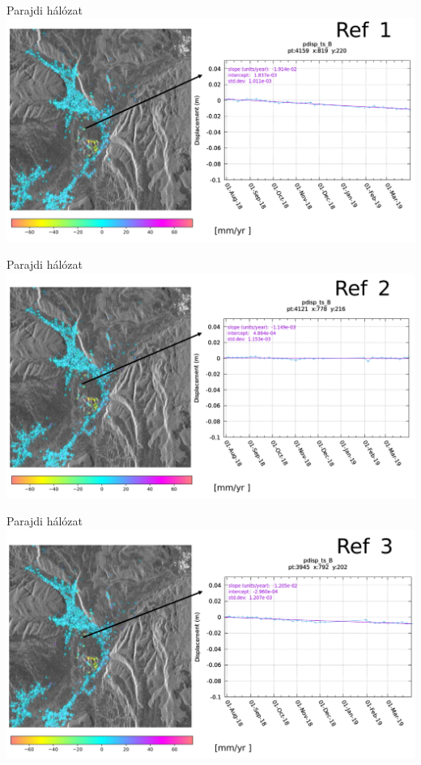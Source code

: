 \documentclass{beamer}
\begin{document}
\begin{frame}{Parajdi hálózat}
\includegraphics[width=\textwidth]{parajd_ts2.png}
\end{frame}

\begin{frame}{Parajdi hálózat}
\includegraphics[width=\textwidth]{parajd_ts3.png}
\end{frame}

\begin{frame}{Parajdi hálózat}
\includegraphics[width=\textwidth]{parajd_ts4.png}
\end{frame}
\end{document}
